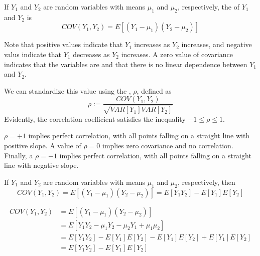 \documentclass[12pt, a4paper, twoside, openright, titlepage]{book}
\begin{document}
\begin{defn}{}{}
    If $Y_1$ and $Y_2$ are random variables with means $\mu_1$ and $\mu_2$, respectively, the  of $Y_1$ and $Y_2$ is \begin{equation*}
        COV(Y_1,Y_2) = E[(Y_1-\mu_1)(Y_2-\mu_2)]
    \end{equation*}
\end{defn}

Note that positive values indicate that $Y_1$ increases as $Y_2$ increases, and negative valus indicate that $Y_1$ decreases as $Y_2$ increases. A zero value of covariance indicates that the variables are  and that there is no linear dependence between $Y_1$ and $Y_2$.

\begin{defn}{}{}
    We can standardize this value using the , $\rho$, defined as \begin{equation*}
        \rho := \frac{COV(Y_1,Y_2)}{\sqrt{VAR[Y_1]VAR[Y_2]}}
    \end{equation*}
    Evidently, the correlation coefficient satisfies the inequality $-1 \leq \rho \leq 1$.
\end{defn}

$\rho = +1$ implies perfect correlation, with all points falling on a straight line with positive slope. A value of $\rho = 0$ implies zero covariance and no correlation. Finally, a $\rho = -1$ implies perfect correlation, with all points falling on a straight line with negative slope.

\begin{thm}{}{}
    If $Y_1$ and $Y_2$ are random variables with means $\mu_1$ and $\mu_2$, respectively, then \begin{equation*}
        COV(Y_1,Y_2) = E[(Y_1-\mu_1)(Y_2-\mu_2)] = E[Y_1Y_2] - E[Y_1]E[Y_2]
    \end{equation*}
\end{thm}
\begin{proof*}{}{}
    \begin{align*}
        COV(Y_1,Y_2) &= E[(Y_1-\mu_1)(Y_2-\mu_2)] \\
        &= E[Y_1Y_2-\mu_1Y_2-\mu_2Y_1+\mu_1\mu_2] \\
        &= E[Y_1Y_2] - E[Y_1]E[Y_2] - E[Y_1]E[Y_2] + E[Y_1]E[Y_2] \\
        &= E[Y_1Y_2] - E[Y_1]E[Y_2]
    \end{align*}
\end{proof*}
\end{document}
